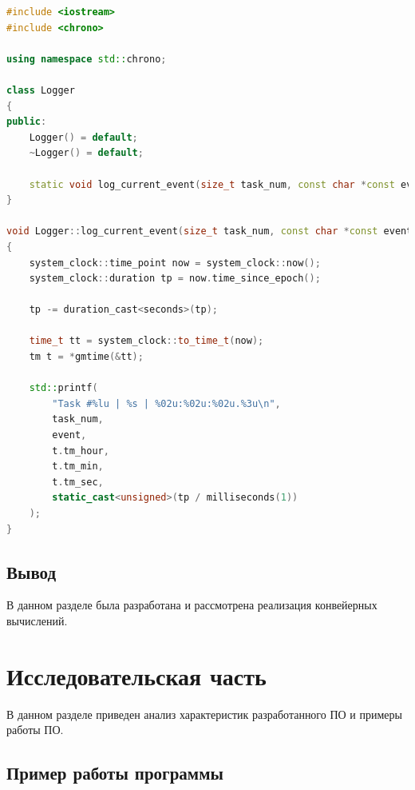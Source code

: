 \documentclass[12pt]{report}
\begin{document}
\begin{lstlisting}[label=some-code,caption=Реализация класса логирования, language=C++]
#include <iostream>
#include <chrono>

using namespace std::chrono;

class Logger 
{
public:
	Logger() = default;
	~Logger() = default;
	
	static void log_current_event(size_t task_num, const char *const event);
}

void Logger::log_current_event(size_t task_num, const char *const event) 
{
	system_clock::time_point now = system_clock::now();
	system_clock::duration tp = now.time_since_epoch();
	
	tp -= duration_cast<seconds>(tp);
	
	time_t tt = system_clock::to_time_t(now);
	tm t = *gmtime(&tt);
	
	std::printf(
		"Task #%lu | %s | %02u:%02u:%02u.%3u\n", 
		task_num,
		event, 
		t.tm_hour, 
		t.tm_min, 
		t.tm_sec, 
		static_cast<unsigned>(tp / milliseconds(1))
	);
}
\end{lstlisting}


\section*{Вывод}

В данном разделе была разработана и рассмотрена реализация конвейерных вычислений.

\chapter{Исследовательская часть}

В данном разделе приведен анализ характеристик разработанного ПО  и примеры работы ПО.

\section{Пример работы программы}
\end{document}

